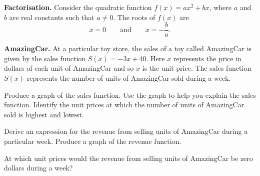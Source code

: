 \documentclass[a4paper,oneside,12pt]{article}
\begin{document}
\begin{theorem}
\label{thm:quadroots:quadratic_function_vertical_intercept_zero}
\textbf{Factorisation.}
Consider the quadratic function $f(x) = ax^2 + bx$, where $a$ and $b$
are real constants such that $a \neq 0$.  The roots of $f(x)$ are
\[
x = 0
\qquad
\text{and}
\qquad
x = -\frac{b}{a}.
\]
\end{theorem}

\begin{example}
\label{eg:quadroots:AmazingCar}
\textbf{AmazingCar.}
At a particular toy store, the sales of a toy called AmazingCar is
given by the sales function $S(x) = -3x + 40$.  Here $x$ represents
the price in dollars of each unit of AmazingCar and so $x$ is the unit
price.  The sales function $S(x)$ represents the number of units of
AmazingCar sold during a week.
\begin{packedenum}
\item\label{subeg:quadroots:AmazingCar_graph_sales_function}
  Produce a graph of the sales function.  Use the graph to help you
  explain the sales function.  Identify the unit prices at which the
  number of units of AmazingCar sold is highest and lowest.

\item\label{subeg:quadroots:AmazingCar_revenue_function}
  Derive an expression for the revenue from selling units of
  AmazingCar during a particular week.  Produce a graph of the revenue
  function.

\item\label{subeg:quadroots:AmazingCar_price_zero_revenue}
  At which unit prices would the revenue from selling units of
  AmazingCar be zero dollars during a week?
\end{packedenum}
\end{example}
\end{document}
